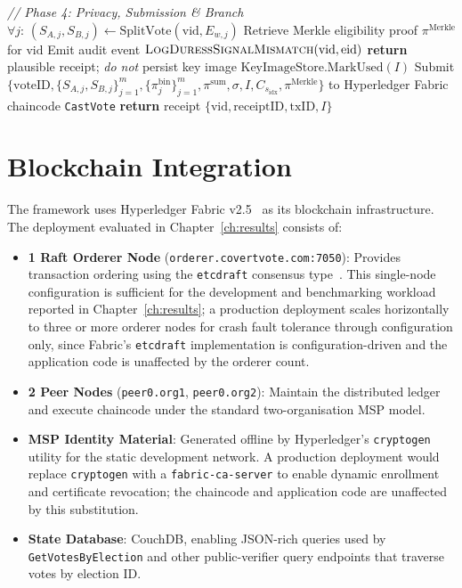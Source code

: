 \begin{algorithm}[H]
\begin{algorithmic}[1]
\Statex \textit{// Phase 4: Privacy, Submission \& Branch}
\State $\forall j:\, (S_{A,j}, S_{B,j}) \gets \text{SplitVote}(\text{vid}, E_{w,j})$ 
\State Retrieve Merkle eligibility proof $\pi^{\text{Merkle}}$ for $\text{vid}$
 
    \State Emit audit event $\textsc{LogDuressSignalMismatch}(\text{vid}, \text{eid})$
    \State \textbf{return} plausible receipt; \emph{do not} persist key image 
\EndIf
\State $\text{KeyImageStore}.\text{MarkUsed}(I)$ 
\State Submit $\{\text{voteID}, \{S_{A,j}, S_{B,j}\}_{j=1}^m, \{\pi^{\text{bin}}_j\}_{j=1}^m, \pi^{\text{sum}}, \sigma, I, C_{s_{\text{idx}}}, \pi^{\text{Merkle}}\}$ to Hyperledger Fabric chaincode \texttt{CastVote}
\State \textbf{return} receipt $\{\text{vid}, \text{receiptID}, \text{txID}, I\}$
\end{algorithmic}
\end{algorithm}

\section{Blockchain Integration}
\label{sec:blockchain-integration}

The framework uses Hyperledger Fabric v2.5~\cite{androulaki2018} as its blockchain infrastructure. The deployment evaluated in Chapter~\ref{ch:results} consists of:

\begin{itemize}
    \item \textbf{1 Raft Orderer Node} (\texttt{orderer.covertvote.com:7050}): Provides transaction ordering using the \texttt{etcdraft} consensus type~\cite{ongaro2014raft}. This single-node configuration is sufficient for the development and benchmarking workload reported in Chapter~\ref{ch:results}; a production deployment scales horizontally to three or more orderer nodes for crash fault tolerance through configuration only, since Fabric's \texttt{etcdraft} implementation is configuration-driven and the application code is unaffected by the orderer count.
    \item \textbf{2 Peer Nodes} (\texttt{peer0.org1}, \texttt{peer0.org2}): Maintain the distributed ledger and execute chaincode under the standard two-organisation MSP model.
    \item \textbf{MSP Identity Material}: Generated offline by Hyperledger's \texttt{cryptogen} utility for the static development network. A production deployment would replace \texttt{cryptogen} with a \texttt{fabric-ca-server} to enable dynamic enrollment and certificate revocation; the chaincode and application code are unaffected by this substitution.
    \item \textbf{State Database}: CouchDB, enabling JSON-rich queries used by \texttt{GetVotesByElection} and other public-verifier query endpoints that traverse votes by election ID.
\end{itemize}

